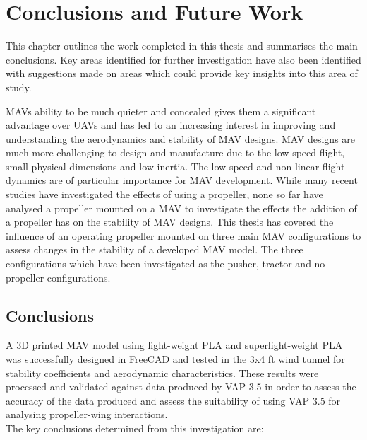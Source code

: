 \graphicspath{{./Figs/}}

\chapter{Conclusions and Future Work} 
This chapter outlines the work completed in this thesis and summarises the main conclusions. Key areas identified for further investigation have also been identified with suggestions made on areas which could provide key insights into this area of study. 

\acrshort{MAV}s ability to be much quieter and concealed gives them a significant advantage over \acrshort{UAV}s \cite{Chaturvedi2019} and has led to an increasing interest in improving and understanding the aerodynamics and stability of \acrshort{MAV} designs. \acrshort{MAV} designs are much more challenging to design and manufacture due to the low-speed flight, small physical dimensions and low inertia. The low-speed and non-linear flight dynamics are of particular importance for MAV development. While many recent studies have investigated the effects of using a propeller, none so far have analysed a propeller mounted on a MAV to investigate the effects the addition of a propeller has on the stability of \acrshort{MAV} designs. This thesis has covered the influence of an operating propeller mounted on three main \acrshort{MAV} configurations to assess changes in the stability of a developed \acrshort{MAV} model. The three configurations which have been investigated as the pusher, tractor and no propeller configurations. 



\section{Conclusions}

A 3D printed \acrshort{MAV} model using light-weight \acrshort{PLA} and superlight-weight \acrshort{PLA} was successfully designed in FreeCAD and tested in the 3x4 ft wind tunnel for stability coefficients and aerodynamic characteristics. These results were processed and validated against data produced by VAP 3.5 in order to assess the accuracy of the data produced and assess the suitability of using VAP 3.5 for analysing propeller-wing interactions.\\

The key conclusions determined from this investigation are:

